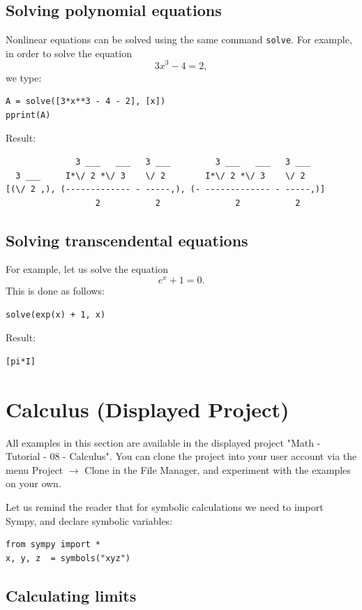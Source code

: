 \documentclass[article,A4,12pt]{llncs}
\begin{document}
\subsection{Solving polynomial equations}

Nonlinear equations can be solved using the same command {\tt solve}.
For example, in order to solve the equation 
$$
3x^3 - 4 = 2,
$$
we type:
\begin{verbatim}
A = solve([3*x**3 - 4 - 2], [x])
pprint(A)
\end{verbatim}
Result:
\begin{verbatim}
              3 ___   ___   3 ___         3 ___   ___   3 ___   
  3 ___     I*\/ 2 *\/ 3    \/ 2        I*\/ 2 *\/ 3    \/ 2    
[(\/ 2 ,), (------------- - -----,), (- ------------- - -----,)]
                  2           2               2           2     
\end{verbatim}

\subsection{Solving transcendental equations}

For example, let us solve the equation
$$
e^x + 1 = 0.
$$
This is done as follows:
\begin{verbatim}
solve(exp(x) + 1, x)
\end{verbatim}
Result:
\begin{verbatim}
[pi*I]
\end{verbatim}


\section{Calculus (Displayed Project)}

All examples in this section are available in the displayed project 
"Math - Tutorial - 08 - Calculus". You can clone the project into 
your user account via the menu Project $\rightarrow$ Clone in the File 
Manager, and experiment with the examples on your own.

Let us remind the reader that for symbolic calculations we need to 
import Sympy, and declare symbolic variables:
\begin{verbatim}
from sympy import *
x, y, z  = symbols("xyz")
\end{verbatim}

\subsection{Calculating limits}
\end{document}
